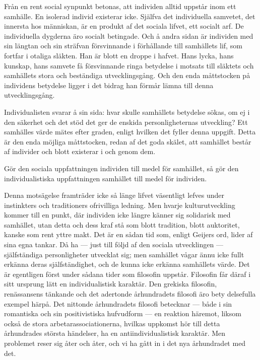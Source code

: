 \documentclass[12pt]{article}
\newcommand{\opage}[1]{\marginnote{\footnotesize\textit{[#1]}}}
\begin{document}
Från en rent social synpunkt betonas, att individen alltid uppstår inom ett samhälle. En isolerad individ existerar icke. Själfva det individuella samvetet, det innersta hos människan, är en produkt af det sociala lifvet, ett socialt arf. De individuella dygderna äro socialt betingade. Och å andra sidan är individen med sin längtan och sin sträfvan försvinnande i förhållande till samhällets lif, som fortfar i otaliga släkten. Han är blott en droppe i hafvet. Hans lycka, hans kunskap, hans samvete få försvinnande ringa betydelse i motsats till släktets och samhällets stora och beständiga utvecklingsgång. Och den enda måttstocken på individens betydelse ligger i det bidrag han förmår lämna till denna utvecklingsgång.

Individualisten svarar å sin sida: hvar skulle samhällets betydelse sökas, om ej i den säkerhet och det stöd det ger de enskida %
personligheternas utveckling? Ett samhälles värde mätes efter graden, enligt hvilken det fyller denna uppgift. Detta %
\opage{41}
är den enda möjliga måttstocken, redan af det goda skälet, att samhället består af individer och blott existerar i och genom dem.

Gör den sociala uppfattningen individen till medel för samhället, så gör den individualistiska uppfattningen samhället till medel för individen.

Denna motsägelse framträder icke så länge lifvet väsentligt lefves under instinkters och traditioners ofrivilliga ledning. Men hvarje kulturutveckling kommer till en punkt, där individen icke längre känner sig solidarisk med samhället, utan detta och dess kraf stå som blott tradition, blott auktoritet, kanske som rent yttre makt. Det är en sådan tid som, enligt Geijers ord, lider af sina egna tankar. Då ha --- just till följd af den sociala utvecklingen --- själfständiga personligheter utvecklat sig; men samhället vågar ännu icke fullt erkänna deras själfständighet, och de kunna icke erkänna samhällets värde. Det är egentligen först under sådana tider som filosofin uppstår. Filosofin får däraf i sitt ursprung lätt en individualistisk karaktär. Den grekiska filosofin, renässansens tänkande och det adertonde århundradets filosofi äro bety%
\opage{42}
delsefulla exempel härpå. Det nittonde århundradets filosofi betecknar --- både i sin romantiska och sin positivistiska hufvudform --- en reaktion häremot, liksom också de stora arbetarassociationerna, hvilkas uppkomst hör till detta århundrades största händelser, ha en antiindividualistisk karaktär. Men problemet reser sig åter och åter, och vi ha gått in i det nya århundradet med det.
\end{document}
